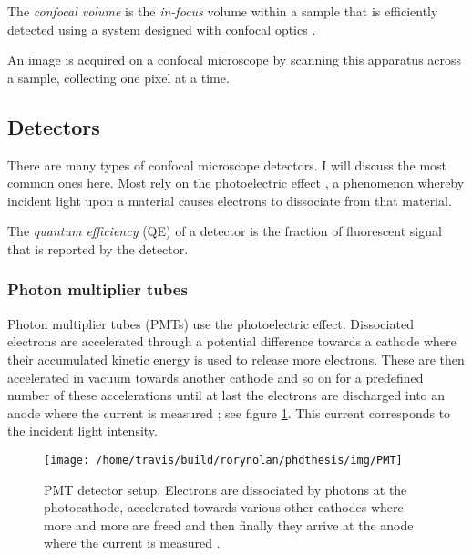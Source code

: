 \documentclass[12pt,]{book}
\theoremstyle{definition}
\theoremstyle{definition}
\theoremstyle{definition}
\theoremstyle{remark}
\let\BeginKnitrBlock\begin \let\EndKnitrBlock\end
\begin{document}
\BeginKnitrBlock{definition}
\protect\hypertarget{def:unnamed-chunk-5}{}{\label{def:unnamed-chunk-5} }The
\emph{confocal volume} is the \emph{in-focus} volume within a sample
that is efficiently detected using a system designed with confocal
optics \citep{fcsxpert}.
\EndKnitrBlock{definition}

An image is acquired on a confocal microscope by scanning this apparatus
across a sample, collecting one pixel at a time.

\subsection{Detectors}\label{detectors}

There are many types of confocal microscope detectors. I will discuss
the most common ones here. Most rely on the photoelectric effect
\citep{photoelectric}, a phenomenon whereby incident light upon a
material causes electrons to dissociate from that material.

\BeginKnitrBlock{definition}
\protect\hypertarget{def:unnamed-chunk-6}{}{\label{def:unnamed-chunk-6} }The
\emph{quantum efficiency} (QE) of a detector is the fraction of
fluorescent signal that is reported by the detector.
\EndKnitrBlock{definition}

\subsubsection{Photon multiplier tubes}\label{photon-multiplier-tubes}

Photon multiplier tubes (PMTs) use the photoelectric effect. Dissociated
electrons are accelerated through a potential difference towards a
cathode where their accumulated kinetic energy is used to release more
electrons. These are then accelerated in vacuum towards another cathode
and so on for a predefined number of these accelerations until at last
the electrons are discharged into an anode where the current is measured
\citep{HammamatsuPMT}; see figure \ref{fig:PMT}. This current
corresponds to the incident light intensity.






\begin{figure}

\texttt{[image: /home/travis/build/rorynolan/phdthesis/img/PMT]} \hfill{}

\caption{PMT detector setup. Electrons are dissociated by
photons at the photocathode, accelerated towards various other cathodes
where more and more are freed and then finally they arrive at the anode
where the current is measured \citep{LeicaDetectors}.}\label{fig:PMT}
\end{figure}
\end{document}
